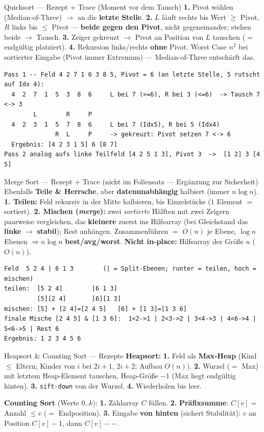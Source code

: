 \documentclass[10pt,a4paper]{article}
\begin{document}
\begin{defbox}{Quicksort — Rezept + Trace (Moment vor dem Tausch)}
\small
\textbf{1.} Pivot wählen (Median-of-Three) $\to$ an die \textbf{letzte Stelle}.
\textbf{2.} $L$ läuft rechts bis Wert $\ge$ Pivot, $R$ links bis $\le$ Pivot — \textbf{beide gegen
den Pivot}, nicht gegeneinander; stehen beide $\to$ Tausch.
\textbf{3.} Zeiger gekreuzt $\to$ Pivot an Position von $L$ tauschen ($=$ endgültig platziert).
\textbf{4.} Rekursion links/rechts \textbf{ohne} Pivot. Worst Case $n^2$ bei sortierter Eingabe
(Pivot immer Extremum) — Median-of-Three entschärft das.
\begin{Verbatim}[fontsize=\footnotesize,xleftmargin=6pt]
Pass 1 -- Feld 4 2 7 1 6 3 8 5, Pivot = 6 (an letzte Stelle, 5 rutscht auf Idx 4):
  4  2  7  1  5  3  8  6     L bei 7 (>=6), R bei 3 (<=6)  -> Tausch 7 <-> 3
        L        R     P
  4  2  3  1  5  7  8  6     L bei 7 (Idx5), R bei 5 (Idx4)
              R  L     P     -> gekreuzt: Pivot setzen 7 <-> 6
  Ergebnis: [4 2 3 1 5] 6 [8 7]
Pass 2 analog aufs linke Teilfeld [4 2 5 1 3], Pivot 3  ->  [1 2] 3 [4 5]
\end{Verbatim}
\end{defbox}

\begin{defbox}{Merge Sort — Rezept + Trace \small(\textmd{nicht im Foliensatz — Ergänzung zur Sicherheit})}
\small
Ebenfalls \textbf{Teile \& Herrsche}, aber \textbf{datenunabhängig} halbiert (immer $n\log n$).
\textbf{1. Teilen:} Feld rekursiv in der Mitte halbieren, bis Einzelstücke ($1$ Element $=$ sortiert).
\textbf{2. Mischen (\emph{merge}):} zwei \emph{sortierte} Hälften mit zwei Zeigern paarweise
vergleichen, das \textbf{kleinere} zuerst ins Hilfsarray (bei Gleichstand das \textbf{linke} $\to$
\textbf{stabil}); Rest anhängen. Zusammenführen $=$ $O(n)$ je Ebene, $\log n$ Ebenen $\Rightarrow
n\log n$ \textbf{best/avg/worst}. \textbf{Nicht in-place:} Hilfsarray der Größe $n$ ($O(n)$).
\begin{Verbatim}[fontsize=\footnotesize,xleftmargin=6pt]
Feld  5 2 4 | 6 1 3        (| = Split-Ebenen; runter = teilen, hoch = mischen)
teilen:  [5 2 4]        [6 1 3]
         [5][2 4]       [6][1 3]
mischen: [5] + [2 4]=[2 4 5]   [6] + [1 3]=[1 3 6]
finale Mische [2 4 5] & [1 3 6]:  1<2->1 | 2<3->2 | 3<4->3 | 4<6->4 | 5<6->5 | Rest 6
Ergebnis: 1 2 3 4 5 6
\end{Verbatim}
\end{defbox}

\begin{defbox}{Heapsort \& Counting Sort — Rezepte}
\small
\textbf{Heapsort:} \textbf{1.} Feld als \textbf{Max-Heap} (Kind $\le$ Eltern; Kinder von $i$ bei
$2i{+}1$, $2i{+}2$; Aufbau $O(n)$). \textbf{2.} Wurzel ($=$ Max) mit letztem Heap-Element tauschen,
Heap-Größe $-1$ (Max liegt endgültig hinten). \textbf{3.} \texttt{sift-down} von der Wurzel.
\textbf{4.} Wiederholen bis leer.\par
\textbf{Counting Sort} (Werte $0..k$): \textbf{1.} Zählarray $C$ füllen. \textbf{2.}
\textbf{Präfixsumme}: $C[v] =$ Anzahl $\le v$ ($=$ Endposition). \textbf{3.} Eingabe \textbf{von
hinten} (sichert Stabilität): $v$ an Position $C[v]{-}1$, dann $C[v]{-}{-}$.
\end{defbox}
\end{document}
